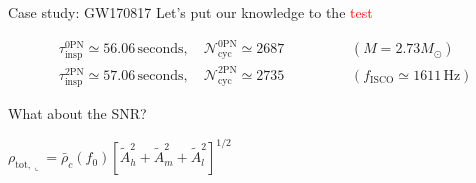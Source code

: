 \documentclass[xcolor=dvipsnames,t]{beamer}
\newcommand{\red}[1]{\textcolor{red}{#1}}
\begin{document}
\begin{frame}{Case study: GW170817}  {Let's put our knowledge to the \red{test}}
\vspace{-7mm}
  \begin{footnotesize}
    \begin{align*}
      &\tau_\text{insp}^{0\text{PN}}  \simeq 56.06\,\text{seconds}, \quad \mathcal{N}_\text{cyc}^{0\text{PN}} \simeq 2687 \hspace{2cm} (M=2.73 M_\odot) \\
      &\tau_\text{insp}^{2\text{PN}} \simeq 57.06\,\text{seconds}, \quad \mathcal{N}_\text{cyc}^{2\text{PN}} \simeq 2735 \hspace{2cm} (f_\text{ISCO}\simeq 1611\,\text{Hz}) 
    \end{align*}
  \end{footnotesize}
  {
  What about the SNR? \quad
  \begin{small}$\rho_{\text{tot},\llcorner}  = {\bar\rho_c(f_0)\left[\tilde{A}_h^2 + \tilde{A}_m^2 + \tilde{A}_l^2 \right]^{1/2}}$   
  \end{small}
  }
  

\end{frame}
\end{document}
